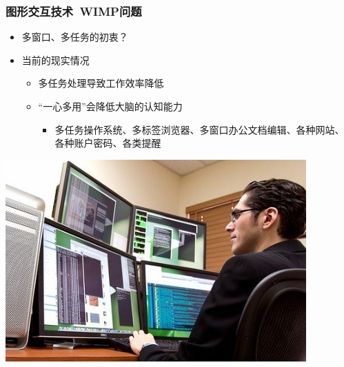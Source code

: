\documentclass{beamer}
\begin{document}
\begin{frame}
	\frametitle{图形交互技术~{\small WIMP问题}}
	\beamertemplatetransparentcovereddynamicmedium
	\begin{itemize}[<+->]
		\item 多窗口、多任务的初衷？
		\item 当前的现实情况
		\begin{itemize}
			\item 多任务处理导致工作效率降低
	
			\item “一心多用”会降低大脑的认知能力
			\begin{itemize}
				\item 多任务操作系统、多标签浏览器、多窗口办公文档编辑、各种网站、各种账户密码、各类提醒
			\end{itemize}		
		\end{itemize}		
	\end{itemize}
	\begin{center}
	\includegraphics[width=.6\textwidth]{images/multi-task.jpg}
	\end{center}
\end{frame}
\end{document}
